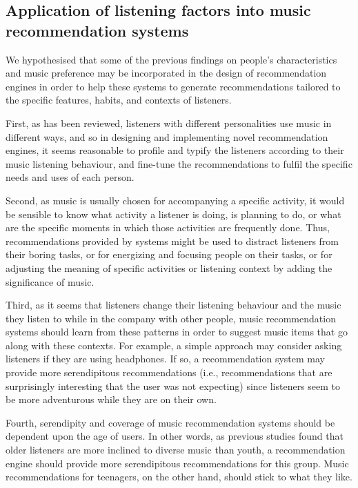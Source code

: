 
\subsection{Application of listening factors into music recommendation systems} \label{sub:application_into_rec_sys}
We hypothesised that some of the previous findings on people's characteristics and music preference may be incorporated in the design of recommendation engines in order to help these systems to generate recommendations tailored to the specific features, habits, and contexts of listeners. 

First, as has been reviewed, listeners with different personalities use music in different ways, and so in designing and implementing novel recommendation engines, it seems reasonable to profile and typify the listeners according to their music listening behaviour, and fine-tune the recommendations to fulfil the specific needs and uses of each person.

Second, as music is usually chosen for accompanying a specific activity, it would be sensible to know what activity a listener is doing, is planning to do, or what are the specific moments in which those activities are frequently done. Thus, recommendations provided by systems might be used to distract listeners from their boring tasks, or for energizing and focusing people on their tasks, or for adjusting the meaning of specific activities or listening context by adding the significance of music. 

Third, as it seems that listeners change their listening behaviour and the music they listen to while in the company with other people, music recommendation systems should learn from these patterns in order to suggest music items that go along with these contexts. For example, a simple approach may consider asking listeners if they are using headphones. If so, a recommendation system may provide more serendipitous recommendations (i.e., recommendations that are surprisingly interesting that the user was not expecting) since listeners seem to be more adventurous while they are on their own.

Fourth, serendipity and coverage of music recommendation systems should be dependent upon the age of users. In other words, as previous studies found that older listeners are more inclined to  diverse music than youth, a recommendation engine should provide more serendipitous recommendations for this group. Music recommendations for teenagers, on the other hand, should stick to what they like.

